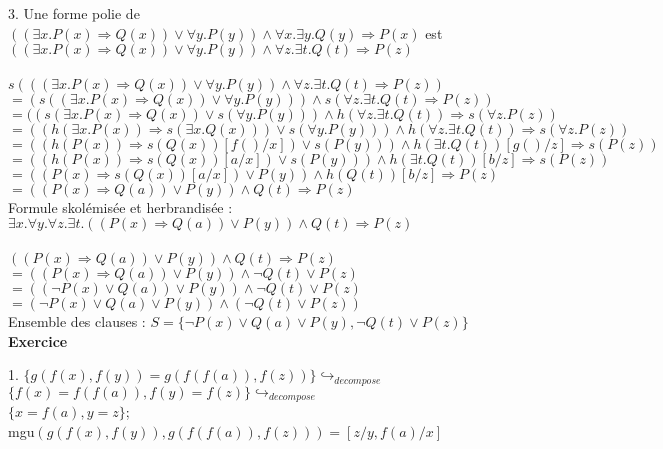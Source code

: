 \documentclass[11pt,letterpaper]{article}
\newcommand{\exo}[1]{\Large \textbf{Exercice \numprint{#1}} \vspace{10px} \normalsize}
\newcommand\tab[1][12pt]{\hspace*{#1}}
\begin{document}
\vspace{6px}

3.  Une forme polie de $((\exists x.P(x) \Rightarrow Q(x)) \lor \forall y.P(y)) \land \forall x.\exists y.Q(y) \Rightarrow P(x)$ est\\\tab
$((\exists x.P(x) \Rightarrow Q(x)) \lor \forall y.P(y)) \land \forall z.\exists t.Q(t) \Rightarrow P(z)$\\\tab
\\\tab
$s(((\exists x.P(x) \Rightarrow Q(x)) \lor \forall y.P(y)) \land \forall z.\exists t.Q(t) \Rightarrow P(z))$\\\tab
$= (s((\exists x.P(x) \Rightarrow Q(x)) \lor \forall y.P(y))) \land s(\forall z.\exists t.Q(t) \Rightarrow P(z))$\\\tab
$= ((s(\exists x.P(x) \Rightarrow Q(x)) \lor s(\forall y.P(y))) \land h(\forall z.\exists t.Q(t)) \Rightarrow s(\forall z.P(z))$\\\tab
$= ((h(\exists x.P(x)) \Rightarrow s(\exists x.Q(x))) \lor s(\forall y.P(y))) \land h(\forall z.\exists t.Q(t)) \Rightarrow s(\forall z.P(z))$\\\tab
$= ((h(P(x)) \Rightarrow s(Q(x))[f()/x]) \lor s(P(y))) \land h(\exists t.Q(t))[g()/z] \Rightarrow s(P(z))$\\\tab
$= ((h(P(x)) \Rightarrow s(Q(x))[a/x]) \lor s(P(y))) \land h(\exists t.Q(t))[b/z] \Rightarrow s(P(z))$\\\tab
$= ((P(x) \Rightarrow s(Q(x))[a/x]) \lor P(y)) \land h(Q(t))[b/z] \Rightarrow P(z)$\\\tab
$= ((P(x) \Rightarrow Q(a)) \lor P(y)) \land Q(t) \Rightarrow P(z)$\\\tab
Formule skolémisée et herbrandisée : $\exists x.\forall y.\forall z.\exists t.((P(x) \Rightarrow Q(a)) \lor P(y)) \land Q(t) \Rightarrow P(z)$\\\tab
\\\tab
$((P(x) \Rightarrow Q(a)) \lor P(y)) \land Q(t) \Rightarrow P(z)$\\\tab
$= ((P(x) \Rightarrow Q(a)) \lor P(y)) \land \neg Q(t) \lor P(z)$\\\tab
$= ((\neg P(x) \lor Q(a)) \lor P(y)) \land \neg Q(t) \lor P(z)$\\\tab
$= (\neg P(x) \lor Q(a) \lor P(y)) \land (\neg Q(t) \lor P(z))$\\\tab
Ensemble des clauses : $S = \{\neg P(x) \lor Q(a) \lor P(y), \neg Q(t) \lor P(z)\}$\\


\exo{6}


1. $\{g(f(x),f(y)) = g(f(f(a)),f(z))\} \hookrightarrow_{decompose}$\\\tab
$\{f(x)=f(f(a)), f(y)=f(z)\} \hookrightarrow_{decompose}$\\\tab
$\{x=f(a), y=z\}$;\\\tab
mgu$(g(f(x),f(y)),g(f(f(a)),f(z))) = [z/y,f(a)/x]$\\
\end{document}

